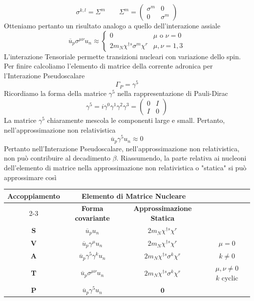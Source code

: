 $$
\sigma^{k,l} = \Sigma^m \qquad \Sigma^m = \begin{pmatrix} {\sigma}^m & 0 \\ 0 & {\sigma}^m \end{pmatrix}
$$
Otteniamo pertanto un risultato analogo a quello dell'interazione assiale
$$
\overline{u}_p \sigma^{\mu\nu} u_n \approx \begin{cases} 0 & \mu \text{ o } \nu = 0 \\ 2m_N \chi^{\dagger s} {\sigma}^m \chi^r & \mu, \nu = 1, 3 \end{cases}
$$
L'interazione Tensoriale permette transizioni nucleari con variazione dello spin. Per finire calcoliamo l'elemento di matrice della corrente adronica per l'Interazione Pseudoscalare
$$
\Gamma_P=\gamma^5
$$
Ricordiamo la forma della matrice $\gamma^5$ nella rappresentazione di Pauli-Dirac
$$
\gamma^5 = i\gamma^0\gamma^1\gamma^2\gamma^3 = \begin{pmatrix} 0 & I \\ I & 0 \end{pmatrix}
$$
La matrice $\gamma^5$ chiaramente mescola le componenti large e small. Pertanto, nell'approssimazione non relativistica
$$
\overline{u}_p \gamma^5 u_n \approx 0
$$
Pertanto nell'Interazione Pseudoscalare, nell'approssimazione non relativistica, non può contribuire al decadimento $\beta$. Riassumendo, la parte relativa ai nucleoni dell'elemento di matrice nella approssimazione non relativistica o "statica" si può approssimare così
\begin{tabular}{|c|c|c|c|}
\hline
\multirow{2}{*}{\textbf{Accoppiamento}} & \multicolumn{2}{c|}{\textbf{Elemento di Matrice Nucleare}} & \multirow{2}{*}{} \\
\cline{2-3}
& \textbf{Forma covariante} & \textbf{Approssimazione Statica} & \\
\hline
\textbf{S} & $\overline{u}_p u_n$ & $2m_N \chi^{\dagger s} \chi^r$ & \\
\hline
\textbf{V} & $\overline{u}_p \gamma^\mu u_n$ & $2m_N \chi^{\dagger s} \chi^r$ & $\mu = 0$ \\
\hline
\textbf{A} & $\overline{u}_p \gamma^5 \gamma^k u_n$ & $2m_N \chi^{\dagger s} \sigma^k \chi^r$ & $k \neq 0$ \\
\hline
\textbf{T} & $\overline{u}_p \sigma^{\mu\nu} u_n$ & $2m_N \chi^{\dagger s} \sigma^k \chi^r$ & $\mu,\nu \neq 0$ $k \text{ cyclic}$ \\
\hline
\textbf{P} & $\overline{u}_p \gamma^5 u_n$ & $\mathbf{0}$ & \\
\hline
\end{tabular}
